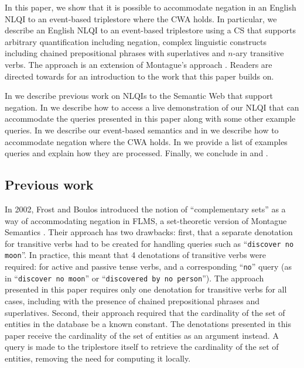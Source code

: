 \documentclass[../main.tex]{subfiles}
\begin{document}
\begin{refsection}
In this paper, we show that it is possible to accommodate negation in an English NLQI to an event-based triplestore where the CWA holds.
In particular, we describe an English NLQI to an event-based triplestore using a CS that supports arbitrary quantification including negation, complex linguistic constructs including chained prepositional phrases with superlatives and $n$-ary transitive verbs.
The approach is an extension of Montague’s approach \cite{Dowty:wall}.  Readers are
directed towards \cite{frostpeelar2019} for an introduction to the work that this paper builds on.

In  we describe previous work on NLQIs to the Semantic Web that support negation.  In  we describe how to access a live demonstration of our NLQI that can accommodate the queries presented in this paper along with some other example queries.  In  we describe our event-based semantics and in  we describe how to accommodate negation where the CWA holds. In  we provide a list of examples queries and explain how they are processed.  Finally, we conclude in  and .



\subsection{Previous work}
\label{subsec:prevwork}

In 2002, Frost and Boulos introduced the notion of ``complementary sets'' as a way of accommodating negation in FLMS, a set-theoretic version of Montague Semantics \cite{frostboulos2002}. Their approach has two drawbacks: first, that a separate denotation for transitive verbs had to be created for handling queries such as ``\texttt{discover no moon}''.  In practice, this meant that 4 denotations of transitive verbs were required: for active and passive tense verbs, and a corresponding ``\texttt{no}'' query (as in ``\texttt{discover no moon}'' or ``\texttt{discovered by no person}'').  The approach presented in this paper requires only one denotation for transitive verbs for all cases, including with the presence of chained prepositional phrases and superlatives.  Second, their approach required that the cardinality of the set of entities in the database be a known constant.  The denotations presented in this paper receive the cardinality of the set of entities as an argument instead.  A query is made to the triplestore itself to retrieve the cardinality of the set of entities, removing the need for computing it locally.


\end{refsection}
\end{document}
